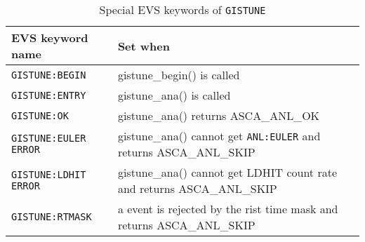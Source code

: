 \begin{table}[htb]
\begin{minipage}{\textwidth}
\begin{center}
\begin{tabular}{|l|l|}
\hline
EVS keyword name & Set when \\ \hline
{\tt GISTUNE:BEGIN}
	& gistune\_begin() is called \\
{\tt GISTUNE:ENTRY}
	& gistune\_ana() is called \\
{\tt GISTUNE:OK}
	& gistune\_ana() returns ASCA\_ANL\_OK \\
{\tt GISTUNE:EULER ERROR}
	& gistune\_ana() cannot get {\tt ANL:EULER}
	  and returns ASCA\_ANL\_SKIP \\
{\tt GISTUNE:LDHIT ERROR}
	& gistune\_ana() cannot get LDHIT count rate
	  and returns ASCA\_ANL\_SKIP \\
{\tt GISTUNE:RTMASK}
	& a event is rejected by the rist time mask
	  and returns ASCA\_ANL\_SKIP \\
\hline
\end{tabular}
\end{center}
\end{minipage}
\caption{Special EVS keywords of {\tt GISTUNE}}
\label{tab:GISTUNE:SpecialEVS}
\end{table}

